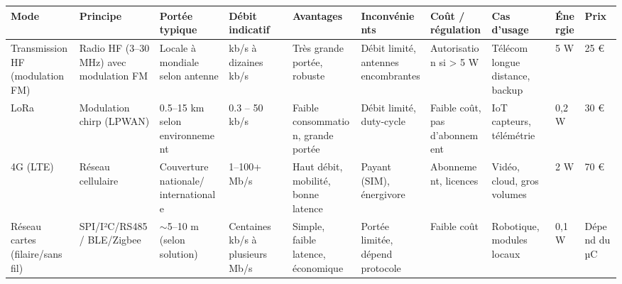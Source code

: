 \begin{landscape}
    \vspace*{\fill} %

    \begin{table}[!ht]
        \centering %
        \begin{tabularx}{\textwidth}{|p{2.5cm}|p{3cm}|p{3cm}|p{3cm}|p{2.5cm}|p{3cm}|p{3cm}|p{3.5cm}|p{1.5cm}|p{1.5cm}|}
            \hline
            \textbf{Mode}                     & \textbf{Principe}                              & \textbf{Portée typique}                & \textbf{Débit indicatif}           & \textbf{Avantages}                       & \textbf{Inconvénients}                          & \textbf{Coût / régulation}     & \textbf{Cas d'usage}                   & \textbf{Énergie} & \textbf{Prix} \\
            \hline
            Transmission HF (modulation FM)   & Radio HF (3–30 MHz) avec modulation FM         & Locale à mondiale selon antenne        & kb/s à dizaines kb/s               & Très grande portée, robuste              & Débit limité, antennes encombrantes             & Autorisation si > 5 W          & Télécom longue distance, backup        & 5 W              & 25 €          \\
            \hline
            LoRa                              & Modulation chirp  (LPWAN)                      & 0.5–15 km  selon environnement         & 0.3 – 50 kb/s                      & Faible consommation,  grande portée      & Débit limité,  duty-cycle                       & Faible coût,  pas d'abonnement & IoT capteurs,  télémétrie              & 0,2 W            & 30 €          \\
            \hline
            4G (LTE)                          & Réseau cellulaire                              & Couverture  nationale/  internationale & 1–100+ Mb/s                        & Haut débit,  mobilité,  bonne latence    & Payant (SIM),  énergivore                       & Abonnement,  licences          & Vidéo, cloud,  gros volumes            & 2 W              & 70 €          \\
            \hline
            Réseau cartes  (filaire/sans fil) & SPI/I²C/RS485/  BLE/Zigbee                     & $\sim$5–10 m  (selon solution)         & Centaines kb/s  à plusieurs Mb/s   & Simple, faible  latence, économique      & Portée limitée,  dépend protocole               & Faible coût                    & Robotique,  modules locaux             & 0,1 W            & Dépend  du µC \\

\end{tabularx}
\end{table}
\end{landscape}
